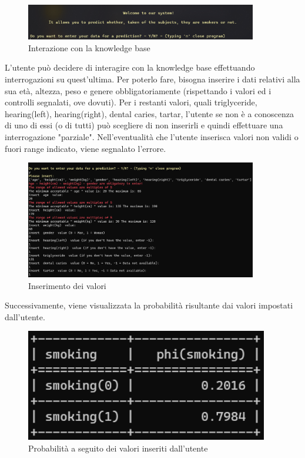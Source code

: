 \documentclass{article}
\begin{document}
\begin{figure}[H]
        \includegraphics[width=0.9\textwidth]{welcome}
        \centering
        \caption{Interazione con la knowledge base}
        \centering
\end{figure}

L'utente può decidere di interagire con la knowledge base effettuando interrogazioni su quest’ultima. Per poterlo fare, bisogna inserire i dati relativi alla sua età, altezza, peso e genere obbligatoriamente (rispettando i valori ed i controlli segnalati, ove dovuti). Per i restanti valori, quali triglyceride, hearing(left), hearing(right), dental caries, tartar, l'utente se non è a conoscenza di uno di essi (o di tutti) può scegliere di non inserirli e quindi effettuare una interrogazione "parziale". Nell'eventualità che l'utente inserisca valori non validi o fuori range indicato, viene segnalato l'errore.

\begin{figure}[H]
        \includegraphics[width=0.9\textwidth]{interazione1}
        \centering
        \caption{Inserimento dei valori}
        \centering
\end{figure}
%

\noindent
Successivamente, viene visualizzata la probabilità risultante dai valori impostati dall'utente.

\begin{figure}[H]
        \includegraphics[width=10.6cm]{probility}
        \centering
        \caption{Probabilità a seguito dei valori inseriti dall'utente}
        \centering
\end{figure}
%
\end{document}
